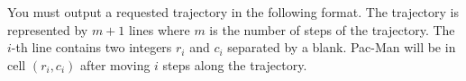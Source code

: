 You must output a requested trajectory in the following format.
The trajectory is represented by $m+1$ lines where $m$ is the number of
steps of the trajectory.
The $i$-th line contains two integers $r_i$ and $c_i$ separated by a blank.
Pac-Man will be in cell $(r_i,c_i)$ after moving $i$ steps along the trajectory.
